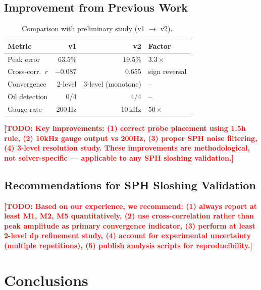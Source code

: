 \documentclass[twocolumn]{svjour3}
\newcommand{\TODO}[1]{\textcolor{red}{\textbf{[TODO: #1]}}}
\begin{document}
\subsection{Improvement from Previous Work}
\label{sec:improvement}

\begin{table}[t]
\caption{Comparison with preliminary study (v1 $\to$ v2).}
\label{tab:v1-v2}
\centering
\small
\begin{tabular}{@{}lrrl@{}}
\toprule
Metric & v1 & v2 & Factor \\
\midrule
Peak error & 63.5\% & 19.5\% & $3.3\times$ \\
Cross-corr.\ $r$ & $-0.087$ & 0.655 & sign reversal \\
Convergence & 2-level & 3-level (monotone) & -- \\
Oil detection & 0/4 & 4/4 & -- \\
Gauge rate & 200\,Hz & 10\,kHz & $50\times$ \\
\bottomrule
\end{tabular}
\end{table}

\TODO{Key improvements: (1) correct probe placement using 1.5h rule,
(2) 10kHz gauge output vs 200Hz, (3) proper SPH noise filtering,
(4) 3-level resolution study. These improvements are methodological,
not solver-specific --- applicable to any SPH sloshing validation.}

\subsection{Recommendations for SPH Sloshing Validation}
\label{sec:recommendations}

\TODO{Based on our experience, we recommend: (1) always report at least
M1, M2, M5 quantitatively, (2) use cross-correlation rather than peak
amplitude as primary convergence indicator, (3) perform at least 2-level
dp refinement study, (4) account for experimental uncertainty (multiple
repetitions), (5) publish analysis scripts for reproducibility.}


\section{Conclusions}
\label{sec:conclusions}
\end{document}
